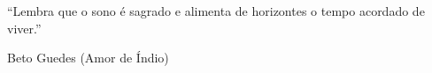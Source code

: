 \begin{epigrafe}
``Lembra que o sono é sagrado e alimenta de horizontes o tempo acordado de viver.''

\hfill Beto Guedes (Amor de Índio)
\end{epigrafe}